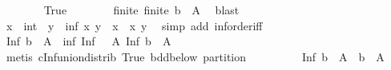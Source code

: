 \begin{isabellebody}
\ \ \ \ \ \ \isamarkupfalse%
\ True\isanewline
\ \ \ \ \ \ \isamarkupfalse%
\ finite{\isacharcolon}{\kern0pt}\ {\isachardoublequoteopen}finite\ {\isacharparenleft}{\kern0pt}{\isacharbraceleft}{\kern0pt}b{\isachardot}{\kern0pt}{\isachardot}{\kern0pt}{\isacharless}{\kern0pt}{}{\isacharbraceright}{\kern0pt}\ {\isasyminter}\ A{\isacharparenright}{\kern0pt}{\isachardoublequoteclose}\ \isamarkupfalse%
\ blast\isanewline
\ \ \ \ \ \ \isamarkupfalse%
\ {\isachardoublequoteopen}{\isacharparenleft}{\kern0pt}x\ {\isacharcolon}{\kern0pt}{\isacharcolon}{\kern0pt}\ int{\isacharparenright}{\kern0pt}\ {\isasymle}\ y\ {\isasymLongrightarrow}\ inf\ x\ y\ {\isacharequal}{\kern0pt}\ x{\isachardoublequoteclose}\ \ x\ y\ \isamarkupfalse%
\ {\isacharparenleft}{\kern0pt}simp\ add{\isacharcolon}{\kern0pt}\ inf{\isachardot}{\kern0pt}order{\isacharunderscore}{\kern0pt}iff{\isacharparenright}{\kern0pt}\isanewline
\ \ \ \ \ \ \isamarkupfalse%
\ {\isachardoublequoteopen}Inf\ {\isacharparenleft}{\kern0pt}{\isacharbraceleft}{\kern0pt}b{\isachardot}{\kern0pt}{\isachardot}{\kern0pt}{\isacharbraceright}{\kern0pt}\ {\isasyminter}\ A{\isacharparenright}{\kern0pt}\ {\isacharequal}{\kern0pt}\ inf\ {\isacharparenleft}{\kern0pt}Inf\ {\isacharparenleft}{\kern0pt}{\isacharbraceleft}{\kern0pt}{}{\isachardot}{\kern0pt}{\isachardot}{\kern0pt}{\isacharbraceright}{\kern0pt}\ {\isasyminter}\ A{\isacharparenright}{\kern0pt}{\isacharparenright}{\kern0pt}\ {\isacharparenleft}{\kern0pt}Inf\ {\isacharparenleft}{\kern0pt}{\isacharbraceleft}{\kern0pt}b{\isachardot}{\kern0pt}{\isachardot}{\kern0pt}{\isacharless}{\kern0pt}{}{\isacharbraceright}{\kern0pt}\ {\isasyminter}\ A{\isacharparenright}{\kern0pt}{\isacharparenright}{\kern0pt}{\isachardoublequoteclose}\ \isamarkupfalse%
\ {\isacharparenleft}{\kern0pt}metis\ cInf{\isacharunderscore}{\kern0pt}union{\isacharunderscore}{\kern0pt}distrib\ True\ bdd{\isacharunderscore}{\kern0pt}below\ partition{\isacharparenright}{\kern0pt}\isanewline
\ \ \ \ \ \ \isamarkupfalse%
\ \isamarkupfalse%
\ {\isachardoublequoteopen}Inf\ {\isacharparenleft}{\kern0pt}{\isacharbraceleft}{\kern0pt}b{\isachardot}{\kern0pt}{\isachardot}{\kern0pt}{\isacharless}{\kern0pt}{}{\isacharbraceright}{\kern0pt}\ {\isasyminter}\ A{\isacharparenright}{\kern0pt}\ {\isasymin}\ {\isacharparenleft}{\kern0pt}{\isacharbraceleft}{\kern0pt}b{\isachardot}{\kern0pt}{\isachardot}{\kern0pt}{\isacharbraceright}{\kern0pt}\ {\isasyminter}\ A{\isacharparenright}{\kern0pt}{\isachardoublequoteclose}\ \isamarkupfalse%

\end{isabellebody}

